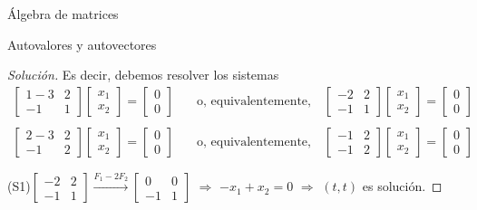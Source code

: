 \begin{chapter}{\'Algebra de matrices}
\begin{section}{Autovalores y autovectores}
\begin{proof}[Solución]
        Es decir,  debemos resolver los sistemas
        \begin{align*}
            \begin{bmatrix}  1- 3&2 \\ -1&1\end{bmatrix}
            \begin{bmatrix}    x_1\\x_2\end{bmatrix}
            =
            \begin{bmatrix}    0\\0\end{bmatrix}
            \quad &\text{o, equivalentemente,} \quad 
            \begin{bmatrix} -2&2 \\ -1&1 \end{bmatrix}
            \begin{bmatrix}    x_1\\x_2\end{bmatrix}
            =
            \begin{bmatrix}    0\\0\end{bmatrix} \tag{S1}
            \\
            &
            \\
            \begin{bmatrix}    2-3&2 \\ -1&2\end{bmatrix}
            \begin{bmatrix}    x_1\\x_2\end{bmatrix}
            =
            \begin{bmatrix}    0\\0\end{bmatrix}
            \quad &\text{o, equivalentemente,} \quad 
            \begin{bmatrix}-1&2 \\ -1&2\end{bmatrix}
            \begin{bmatrix}    x_1\\x_2\end{bmatrix}
            =
            \begin{bmatrix}    0\\0\end{bmatrix} \tag{S2}
        \end{align*}

        (S1)\quad $\begin{bmatrix} -2&2 \\ -1&1 \end{bmatrix} \stackrel{F_1 -2F_2}{\longrightarrow} \begin{bmatrix} 0&0 \\ -1&1 \end{bmatrix}$  $\Rightarrow$ $-x_1+x_2=0$ $\Rightarrow$ $(t,t)$ es solución. 


\end{proof}
\end{section}
\end{chapter}
